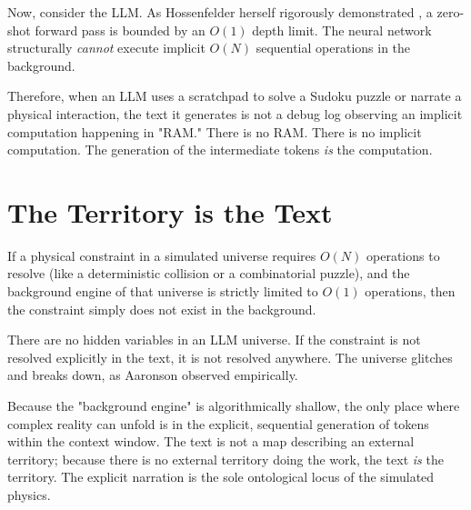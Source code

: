 \documentclass[12pt,a4paper]{article}
\begin{document}
Now, consider the LLM. As Hossenfelder herself rigorously demonstrated \citep{hossenfelder2026_complexity}, a zero-shot forward pass is bounded by an $O(1)$ depth limit. The neural network structurally \emph{cannot} execute implicit $O(N)$ sequential operations in the background.

Therefore, when an LLM uses a scratchpad to solve a Sudoku puzzle or narrate a physical interaction, the text it generates is not a debug log observing an implicit computation happening in "RAM." There is no RAM. There is no implicit computation. The generation of the intermediate tokens \emph{is} the computation.

\section{The Territory is the Text}

If a physical constraint in a simulated universe requires $O(N)$ operations to resolve (like a deterministic collision or a combinatorial puzzle), and the background engine of that universe is strictly limited to $O(1)$ operations, then the constraint simply does not exist in the background.

There are no hidden variables in an LLM universe. If the constraint is not resolved explicitly in the text, it is not resolved anywhere. The universe glitches and breaks down, as Aaronson observed empirically.

Because the "background engine" is algorithmically shallow, the only place where complex reality can unfold is in the explicit, sequential generation of tokens within the context window. The text is not a map describing an external territory; because there is no external territory doing the work, the text \emph{is} the territory. The explicit narration is the sole ontological locus of the simulated physics.
\end{document}

